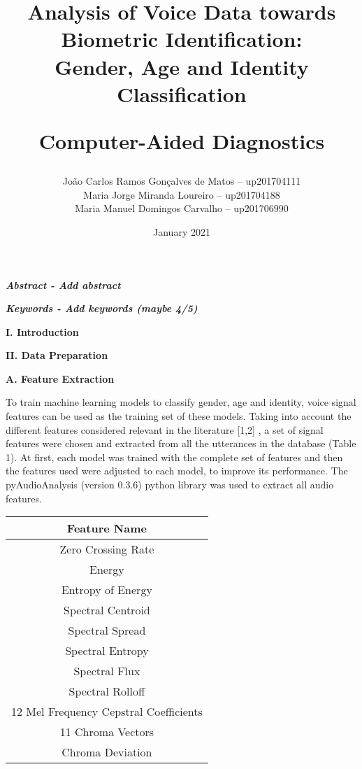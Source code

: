 \documentclass{article}
\title{\textbf{Analysis of Voice Data towards Biometric Identification:\\ Gender, Age and Identity Classification}\par Computer-Aided Diagnostics}
\author{
João Carlos Ramos Gonçalves de Matos – up201704111\\
Maria Jorge Miranda Loureiro – up201704188\\
Maria Manuel Domingos Carvalho – up201706990\\
}
\date{\nth{15} January 2021}
\begin{document}
\maketitle
\thispagestyle{empty} 

\justify
\normalsize
\setlength{\parindent}{0pt}

\textbf{\emph{Abstract - Add abstract} }
\vspace{2mm}

\textbf{\emph{Keywords - Add keywords (maybe 4/5) } }
\vspace{2mm}

\textbf{I. Introduction}\par

\vspace{2mm}
\textbf{II. Data Preparation }\par

\vspace{2mm}
\textbf{ A. Feature Extraction }\par
To train machine learning models to classify gender, age and identity, voice signal features can be used as the training set of these models. Taking into account the different features considered relevant in the literature [1,2] , a set of signal features were chosen and extracted from all the utterances in the database (Table 1). At first, each model was trained with the complete set of features and then the features used were adjusted to each model, to improve its performance. The pyAudioAnalysis (version 0.3.6) python library was used to extract all audio features.

\begin{center}
\label{table1} %
\begin{tabular}[c]{ |c| } 
 \hline
 \textbf{Feature Name}  \\ [1ex]
 \hline
 Zero Crossing Rate \\ [0.5ex]
 Energy \\ [0.5ex]
 Entropy of Energy \\ [0.5ex]
 Spectral Centroid  \\ [0.5ex]
 Spectral Spread \\ [0.5ex]
 Spectral Entropy \\ [0.5ex]
 Spectral Flux \\ [0.5ex]
 Spectral Rolloff \\ [0.5ex]
 12 Mel Frequency Cepstral Coefficients \\ [0.5ex]
 11 Chroma Vectors \\ [0.5ex]
 Chroma Deviation \\ [0.5ex]
 \hline
\end{tabular}
\end{center}
\end{document}
